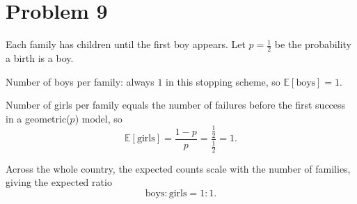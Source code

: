 \section*{Problem 9}

Each family has children until the first boy appears. Let \(p=\tfrac12\) be the probability a birth is a boy.

Number of boys per family: always \(1\) in this stopping scheme, so \(\mathbb{E}[\text{boys}]=1\).

Number of girls per family equals the number of failures before the first success in a geometric(\(p\)) model, so
\[
\mathbb{E}[\text{girls}]=\frac{1-p}{p}=\frac{\tfrac12}{\tfrac12}=1.
\]

Across the whole country, the expected counts scale with the number of families, giving the expected ratio
\[
\text{boys}:\text{girls}=1:1.
\]
